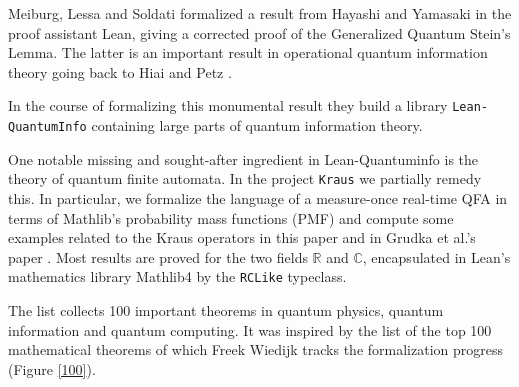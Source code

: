 Meiburg, Lessa and Soldati \cite{meiburg2025formalizationgeneralizedquantumsteins} formalized a result from Hayashi and Yamasaki \cite{hayashi2025generalizedquantumsteinslemma} in the proof assistant Lean, giving a corrected proof of the Generalized Quantum Stein's Lemma. The latter is an important result in operational quantum information theory going back to Hiai and Petz \cite{HiaiPetz1991}.

In the course of formalizing this monumental result they build a library \texttt{Lean-QuantumInfo} \cite{meiburg2024quantuminfo} containing large parts of quantum information theory.

One notable missing and sought-after ingredient in Lean-Quantuminfo is the theory of quantum finite automata. In the project \texttt{Kraus} \cite{kraus} we partially remedy this. In particular, we formalize the language of a measure-once real-time QFA \cite{MR2817180,MR2885820} in terms of Mathlib's probability mass functions (PMF) and compute some examples related to the Kraus operators in this paper and in Grudka et al.'s paper \cite{grudka2025quantumsynchronizingwordsresetting}. Most results are proved for the two fields $\mathbb R$ and $\mathbb C$, encapsulated in Lean's mathematics library Mathlib4 by the \texttt{RCLike} typeclass.


The list collects 100 important theorems in quantum physics, quantum information and quantum computing. It was inspired by the list of the top 100 mathematical theorems of which Freek Wiedijk tracks the formalization progress (Figure \ref{100}).

